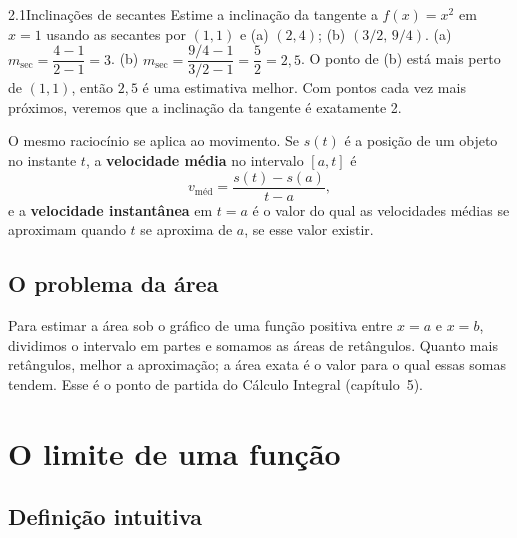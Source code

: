 \begin{exemplo}{2.1}{Inclinações de secantes}
Estime a inclinação da tangente a $f(x)=x^2$ em $x=1$ usando as secantes por $(1,1)$ e
(a) $(2,4)$; (b) $(3/2,\,9/4)$.
\solucao
(a) $m_{\sec}=\dfrac{4-1}{2-1}=3$. (b) $m_{\sec}=\dfrac{9/4-1}{3/2-1}=\dfrac52=2{,}5$. O
ponto de (b) está mais perto de $(1,1)$, então $2{,}5$ é uma estimativa melhor. Com pontos
cada vez mais próximos, veremos que a inclinação da tangente é exatamente 2.
\end{exemplo}

O mesmo raciocínio se aplica ao movimento. Se $s(t)$ é a posição de um objeto no instante
$t$, a \textbf{velocidade média} no intervalo $[a,t]$ é
\[
v_{\text{méd}}=\frac{s(t)-s(a)}{t-a},
\]
e a \textbf{velocidade instantânea} em $t=a$ é o valor do qual as velocidades médias se
aproximam quando $t$ se aproxima de $a$, se esse valor existir.

\subsection{O problema da área}

Para estimar a área sob o gráfico de uma função positiva entre $x=a$ e $x=b$, dividimos o
intervalo em partes e somamos as áreas de retângulos. Quanto mais retângulos, melhor a
aproximação; a área exata é o valor para o qual essas somas tendem. Esse é o ponto de
partida do Cálculo Integral (capítulo~5).


\section{O limite de uma função}

\subsection{Definição intuitiva}

